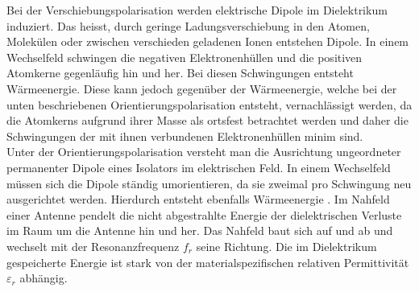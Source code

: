 Bei der Verschiebungspolarisation werden elektrische Dipole im Dielektrikum induziert. Das heisst, durch geringe Ladungsverschiebung in den Atomen, Molekülen oder zwischen verschieden geladenen Ionen entstehen Dipole. In einem Wechselfeld schwingen die negativen Elektronenhüllen und die positiven Atomkerne gegenläufig hin und her. Bei diesen Schwingungen entsteht Wärmeenergie. Diese kann jedoch gegenüber der Wärmeenergie, welche bei der unten beschriebenen Orientierungspolarisation entsteht, vernachlässigt werden, da  die Atomkerns aufgrund ihrer Masse als ortsfest betrachtet werden und daher die Schwingungen der mit ihnen verbundenen Elektronenhüllen minim sind.\\
Unter der Orientierungspolarisation versteht man die Ausrichtung ungeordneter permanenter Dipole eines Isolators im elektrischen Feld. In einem Wechselfeld müssen sich die Dipole ständig umorientieren, da sie zweimal pro Schwingung neu ausgerichtet werden. Hierdurch entsteht ebenfalls Wärmeenergie \cite{DielektrikumPolarisation}. Im Nahfeld einer Antenne pendelt die nicht abgestrahlte Energie der dielektrischen Verluste im Raum um die Antenne hin und her. Das Nahfeld baut sich auf und ab und wechselt mit der Resonanzfrequenz $f_{r}$ seine Richtung. Die im Dielektrikum gespeicherte Energie ist stark von der materialspezifischen relativen Permittivität $\varepsilon_r $ abhängig.\\


